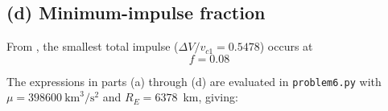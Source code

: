 \subsection*{(d) Minimum-impulse fraction}
From , the smallest total impulse ($\Delta V/v_{c1} = 0.5478$) occurs at
\begin{equation*}
\boxed{f = 0.08}
\end{equation*}

\medskip
\noindent The expressions in parts (a) through (d) are evaluated in \texttt{problem6.py} with $\mu = 398600~\text{km}^3/\text{s}^2$ and $R_E = 6378$~km, giving:

\medskip
{}

\FloatBarrier
